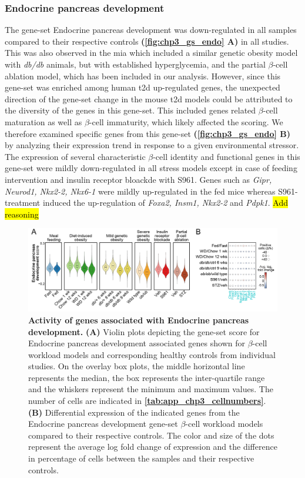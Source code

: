 \subsubsection{Endocrine pancreas development}
The gene-set Endocrine pancreas development was down-regulated in all samples compared to their respective controls \textbf{(\autoref{fig:chp3_gs_endo} A)} in all studies. This was also observed in the \gls{mia} which included a similar genetic obesity model with \textit{db/db} animals, but with established hyperglycemia, and the partial $\beta$-cell ablation model, which has been included in our analysis. However, since this gene-set was enriched among human \gls{t2d} up-regulated genes, the unexpected direction of the gene-set change in the mouse \gls{t2d} models could be attributed to the diversity of the genes in this gene-set. This included genes related $\beta$-cell maturation as well as $\beta$-cell immaturity, which likely affected the scoring. We therefore examined specific genes from this gene-set \textbf{(\autoref{fig:chp3_gs_endo} B)} by analyzing their expression trend in response to a given environmental stressor. The expression of several characteristic $\beta$-cell identity and functional genes in this gene-set were mildly down-regulated in all stress models except in case of feeding intervention and insulin receptor bloackde with S961. Genes such as \textit{Gipr, Neurod1, Nkx2-2, Nkx6-1} were mildly up-regulated in the fed mice whereas S961-treatment induced the up-regulation of \textit{Foxa2, Insm1, Nkx2-2}  and \textit{Pdpk1}. \hl{Add reasoning}

\begin{figure}[H]
\centering
\includegraphics[width=\linewidth]{Chapter5/Fig/F3-13-01.png}
\caption[Activity of genes associated with endocrine pancreas development]{\textbf{Activity of genes associated with Endocrine pancreas development.} \textbf{(A)} Violin plots depicting the gene-set score for Endocrine pancreas development associated genes shown for $\beta$-cell workload models and corresponding healthy controls from individual studies. On the overlay box plots, the middle horizontal line represents the median, the box represents the inter-quartile range and the whiskers represent the minimum and maximum values. The number of cells are indicated in \textbf{\autoref{tab:app_chp3_cellnumbers}}. \textbf{(B)} Differential expression of the indicated genes from the Endocrine pancreas development gene-set $\beta$-cell workload models compared to their respective controls. The color and size of the dots represent the average log fold change of expression and the difference in percentage of cells between the samples and their respective controls.}
\label{fig:chp3_gs_endo}
\end{figure}


